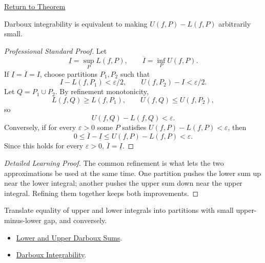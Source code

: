 \newpage
{}
\label{prf:darboux-criterion}
\begin{remark*}[Return]\hyperref[thm:darboux-criterion]{Return to Theorem}\end{remark*}
\begin{theorem*}
Darboux integrability is equivalent to making \(U(f,P)-L(f,P)\) arbitrarily
small.
\end{theorem*}
\begin{proof}[Professional Standard Proof]
\LRAProofBodyStart
Let
\[
  \underline I=\sup_P L(f,P),\qquad
  \overline I=\inf_P U(f,P).
\]
If \(\underline I=\overline I=I\), choose partitions \(P_1,P_2\) such that
\[
  I-L(f,P_1)<\varepsilon/2,
  \qquad
  U(f,P_2)-I<\varepsilon/2.
\]
Let \(Q=P_1\cup P_2\). By refinement monotonicity,
\[
  L(f,Q)\ge L(f,P_1),\qquad U(f,Q)\le U(f,P_2),
\]
so
\[
  U(f,Q)-L(f,Q)<\varepsilon.
\]
Conversely, if for every \(\varepsilon>0\) some \(P\) satisfies
\(U(f,P)-L(f,P)<\varepsilon\), then
\[
  0\le \overline I-\underline I
  \le U(f,P)-L(f,P)<\varepsilon.
\]
Since this holds for every \(\varepsilon>0\), \(\overline I=\underline I\).
\end{proof}
\begin{proof}[Detailed Learning Proof]
\LRAProofBodyStart
The common refinement is what lets the two approximations be used at the same
time. One partition pushes the lower sum up near the lower integral; another
pushes the upper sum down near the upper integral. Refining them together
keeps both improvements.
\end{proof}
\begin{remark*}
Translate equality of upper and lower integrals into partitions with small
upper-minus-lower gap, and conversely.
\end{remark*}
\begin{dependencies}
\begin{itemize}
  \item \hyperref[def:darboux-sums]{Lower and Upper Darboux Sums}.
  \item \hyperref[def:darboux-integrability]{Darboux Integrability}.
\end{itemize}
\end{dependencies}
\clearpage
